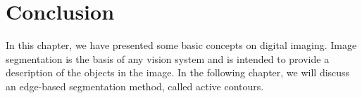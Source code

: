 \section{Conclusion}
In this chapter, we have presented some basic concepts on digital imaging.
Image segmentation is the basis of any vision system and is intended to provide a description of the objects in the image.
In the following chapter, we will discuss an edge-based segmentation method, called active contours.